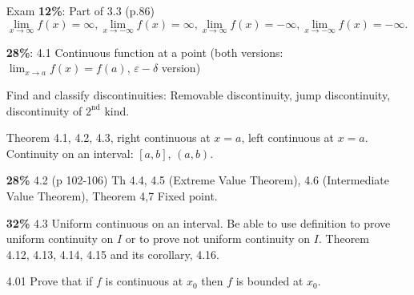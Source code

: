 \begin{enumerate}
   \item[Exam] \textbf{12\%}: Part of 3.3 (p.86)
               $$\lim_{x\rightarrow\infty}f(x) = \infty,
                 \lim_{x\rightarrow-\infty}f(x) = \infty,
                 \lim_{x\rightarrow\infty}f(x) = -\infty,
                 \lim_{x\rightarrow-\infty}f(x) = -\infty.$$
                 
               \textbf{28\%}: 4.1 Continuous function at a point (both versions:
               $\lim_{x\rightarrow a}f(x) = f(a)$, $\varepsilon-\delta$ version)
               
               Find and classify discontinuities: Removable discontinuity,
               jump discontinuity, discontinuity of $2^{\text{nd}}$ kind.
               
               Theorem 4.1, 4.2, 4.3, right continuous at $x = a$, left
               continuous at $x = a$. Continuity on an interval: $[a, b]$,
               $(a, b)$.
               
               
               \textbf{28\%} 4.2 (p 102-106) Th 4.4, 4.5
               (Extreme Value Theorem), 4.6 (Intermediate Value Theorem),
               Theorem 4,7 Fixed point.
               
               \textbf{32\%} 4.3 Uniform continuous on an interval. Be able to
               use definition to prove uniform continuity on  $I$ or to prove
               not uniform continuity on $I$. Theorem 4.12, 4.13, 4.14, 4.15
               and its corollary, 4.16.
   \item[4.01] Prove that if $f$ is continuous at $x_0$ then $f$ is bounded at
               $x_0$.


\end{enumerate}
